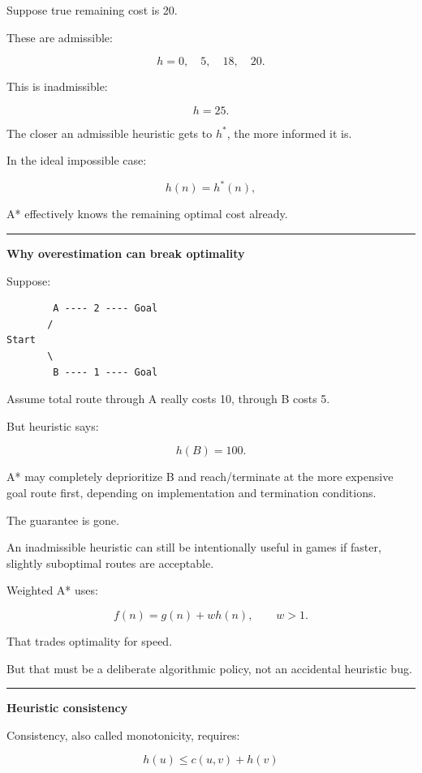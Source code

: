 Suppose true remaining cost is 20.

These are admissible:

\[
h=0,\quad5,\quad18,\quad20.
\]

This is inadmissible:

\[
h=25.
\]

The closer an admissible heuristic gets to \(h^*\), the more informed it is.

In the ideal impossible case:

\[
h(n)=h^*(n),
\]

A* effectively knows the remaining optimal cost already.

\begin{center}\rule{0.5\linewidth}{0.5pt}\end{center}

\textbf{Why overestimation can break optimality}

Suppose:

\begin{verbatim}
        A ---- 2 ---- Goal
       /
Start
       \
        B ---- 1 ---- Goal
\end{verbatim}

Assume total route through A really costs 10, through B costs 5.

But heuristic says:

\[
h(B)=100.
\]

A* may completely deprioritize B and reach/terminate at the more expensive goal route first, depending on implementation and termination conditions.

The guarantee is gone.

An inadmissible heuristic can still be intentionally useful in games if faster, slightly suboptimal routes are acceptable.

Weighted A* uses:

\[
f(n)=g(n)+w h(n),
\qquad
w>1.
\]

That trades optimality for speed.

But that must be a deliberate algorithmic policy, not an accidental heuristic bug.

\begin{center}\rule{0.5\linewidth}{0.5pt}\end{center}

\textbf{Heuristic consistency}

Consistency, also called monotonicity, requires:

\[
\boxed{
h(u)
\le
c(u,v)+h(v)
}
\]

